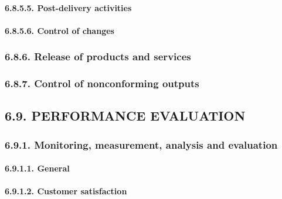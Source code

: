 \documentclass[
]{article}
\begin{document}
\hypertarget{post-delivery-activities}{%
\paragraph{6.8.5.5. Post-delivery
activities}\label{post-delivery-activities}}

\hypertarget{control-of-changes}{%
\paragraph{6.8.5.6. Control of changes}\label{control-of-changes}}

\hypertarget{release-of-products-and-services}{%
\subsubsection{6.8.6. Release of products and
services}\label{release-of-products-and-services}}

\hypertarget{control-of-nonconforming-outputs}{%
\subsubsection{6.8.7. Control of nonconforming
outputs}\label{control-of-nonconforming-outputs}}

\hypertarget{performance-evaluation}{%
\subsection{6.9. PERFORMANCE EVALUATION}\label{performance-evaluation}}

\hypertarget{monitoring-measurement-analysis-and-evaluation}{%
\subsubsection{6.9.1. Monitoring, measurement, analysis and
evaluation}\label{monitoring-measurement-analysis-and-evaluation}}

\hypertarget{general-6}{%
\paragraph{6.9.1.1. General}\label{general-6}}

\hypertarget{customer-satisfaction}{%
\paragraph{6.9.1.2. Customer satisfaction}\label{customer-satisfaction}}
\end{document}

